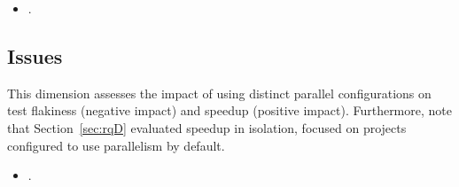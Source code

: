
\begin{center}
\end{center}

\begin{itemize}
    \item \numRQSpeedupTwo{}. \textbf{\RQSpeedupTwo}
\end{itemize}

\begin{center}
\end{center}

\subsection{Issues}
\label{sec:rq6-tradeoffs}

This dimension assesses the impact of using distinct parallel
configurations on test flakiness (negative impact) and speedup
(positive impact).  Furthermore, note that Section~\ref{sec:rqD}
evaluated speedup in isolation, focused on projects configured to use
parallelism by default.

\begin{itemize}
    \item \numRQIssuesOne{}. \textbf{\RQIssuesOne{}}
\end{itemize}



\newcommand{\subcolA}{$\Uparrow_\text{speed}$}
\newcommand{\subcolB}{$\%_\text{fail}$}
\newcommand{\colheader}[1]{\multicolumn{2}{c}{\emph{#1}}}
\newcommand{\blankentry}{\entry{-}{-}}
\newcommand{\subcol}{\subcolA{} & \subcolB{}}
\newcommand{\entry}[2]{#1 & #2}

